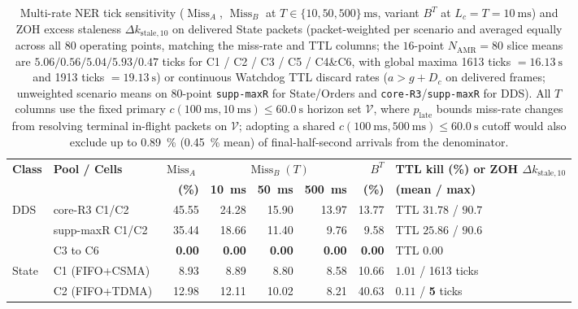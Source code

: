 \documentclass[11pt,a4paper]{article}
\newcommand{\Namr}{\ensuremath{N_{\mathrm{AMR}}}}
\newcommand{\MissA}{\ensuremath{\operatorname{Miss}_A}}
\newcommand{\MissB}{\ensuremath{\operatorname{Miss}_B}}
\begin{document}
\begin{table}[!tbp]
\centering
\footnotesize
\setlength{\tabcolsep}{3.0pt}
\caption{Multi-rate NER tick sensitivity ($\MissA$, $\MissB$ at $T \in \{10, 50, 500\}\,\text{ms}$, variant $B^T$ at $L_c=T=\qty{10}{\milli\second}$) and ZOH excess staleness $\Delta k_{\mathrm{stale},10}$ on delivered State packets (packet-weighted per scenario and averaged equally across all $80$ operating points, matching the miss-rate and TTL columns; the $16$-point $\Namr=80$ slice means are $5.06 / 0.56 / 5.04 / 5.93 / 0.47$ ticks for C1 / C2 / C3 / C5 / C4\&C6, with global maxima \num{1613} ticks $=\qty{16.13}{\second}$ and \num{1913} ticks $=\qty{19.13}{\second}$) or continuous Watchdog TTL discard rates ($a > g + D_c$ on delivered frames; unweighted scenario means on $80$-point \texttt{supp-maxR} for State/Orders and \texttt{core-R3}/\texttt{supp-maxR} for DDS). All $T$ columns use the fixed primary $c(\qty{100}{\milli\second}, \qty{10}{\milli\second}) \le \qty{60.0}{\second}$ horizon set $\mathcal{V}$, where $p_{\mathrm{late}}$ bounds miss-rate changes from resolving terminal in-flight packets on $\mathcal{V}$; adopting a shared $c(\qty{100}{\milli\second}, \qty{500}{\milli\second}) \le \qty{60.0}{\second}$ cutoff would also exclude up to \qty{0.89}{\percent} (\qty{0.45}{\percent} mean) of final-half-second arrivals from the denominator.}
\label{tab:ner_multirate}
\begin{tabular}{@{}l l r r r r r l@{}}
\toprule
\textbf{Class} & \textbf{Pool / Cells} & \textbf{$\MissA$} & \multicolumn{3}{c}{\textbf{$\MissB(T)$}} & \textbf{$B^T$} & \textbf{TTL kill (\%) or ZOH $\Delta k_{\mathrm{stale},10}$} \\
\cmidrule(lr){4-6}
 & & \textbf{(\%)} & \textbf{\qty{10}{\milli\second}} & \textbf{\qty{50}{\milli\second}} & \textbf{\qty{500}{\milli\second}} & \textbf{(\%)} & \textbf{(mean / max)} \\
\midrule
DDS & core-R3 C1/C2 & 45.55 & 24.28 & 15.90 & 13.97 & 13.77 & TTL $31.78$ / $90.7$ \\
 & supp-maxR C1/C2 & 35.44 & 18.66 & 11.40 & 9.76 & 9.58 & TTL $25.86$ / $90.6$ \\
 & C3 to C6 & \textbf{0.00} & \textbf{0.00} & \textbf{0.00} & \textbf{0.00} & \textbf{0.00} & TTL $0.00$ \\
\midrule
State & C1 (FIFO+CSMA) & 8.93 & 8.89 & 8.80 & 8.58 & 10.66 & $1.01$ / \num{1613} ticks \\
 & C2 (FIFO+TDMA) & 12.98 & 12.11 & 10.02 & 8.21 & 40.63 & $0.11$ / \textbf{5} ticks \\

\end{tabular}
\end{table}
\end{document}
